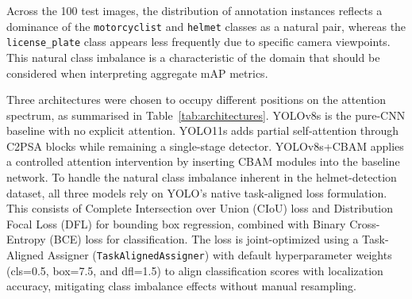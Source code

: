 \documentclass[conference]{IEEEtran}
\begin{document}
\begin{table}[!t]
\caption{Image and annotation-instance distribution per split.}
\label{tab:dataset}
\end{table}

Across the 100 test images, the distribution of annotation instances reflects a dominance of the \texttt{motorcyclist} and \texttt{helmet} classes as a natural pair, whereas the \texttt{license\_plate} class appears less frequently due to specific camera viewpoints. This natural class imbalance is a characteristic of the domain that should be considered when interpreting aggregate mAP metrics.

Three architectures were chosen to occupy different positions on the attention spectrum, as summarised in Table~\ref{tab:architectures}. YOLOv8s is the pure-CNN baseline with no explicit attention. YOLO11s adds partial self-attention through C2PSA blocks while remaining a single-stage detector. YOLOv8s+CBAM applies a controlled attention intervention by inserting CBAM modules into the baseline network. To handle the natural class imbalance inherent in the helmet-detection dataset, all three models rely on YOLO's native task-aligned loss formulation. This consists of Complete Intersection over Union (CIoU) loss and Distribution Focal Loss (DFL) for bounding box regression, combined with Binary Cross-Entropy (BCE) loss for classification. The loss is joint-optimized using a Task-Aligned Assigner (\texttt{TaskAlignedAssigner}) with default hyperparameter weights (cls=0.5, box=7.5, and dfl=1.5) to align classification scores with localization accuracy, mitigating class imbalance effects without manual resampling.

\begin{table}[!t]
\caption{The three architectures and their attention mechanism.}
\label{tab:architectures}
\end{table}
\end{document}
